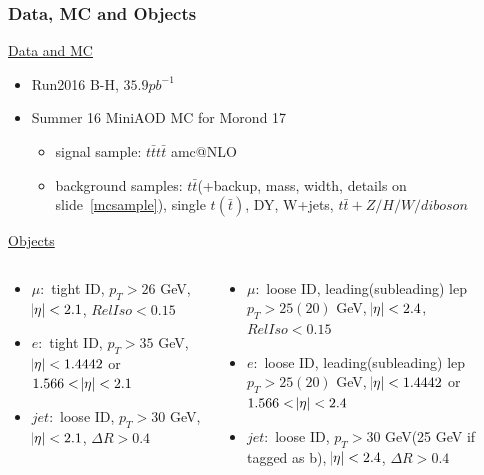 \documentclass{beamer}
\begin{document}

\begin{frame}
\frametitle{Data, MC and Objects}
	\underline{\small {Data and MC}}
	\begin{itemize}
		\item {\small Run2016 B-H, $35.9 pb^{-1}$}
		\item {\small Summer 16 MiniAOD MC for Morond 17}
		\begin{itemize}
			\item signal sample: $t\bar{t}t\bar{t}$ amc@NLO
			\item background samples: $t\bar{t}$(+backup, mass, width, details on slide~\ref{mcsample}), single $t(\bar{t})$, DY, W+jets, $t\bar{t}+Z/H/W/diboson$
		\end{itemize}
	\end{itemize}
	\underline{{\small Objects}}
	\vspace{-20pt}
	\begin{columns}
		\begin{column}{0.5\textwidth}  \vspace{-15pt}
			\begin{itemize}
				\item $\mu:$ {\scriptsize tight ID, $p_{T}>26$ GeV, $\abs{\eta}<2.1$, $RelIso<0.15$} 
				\item $e:$ {\scriptsize tight ID, $p_{T}>35$ GeV, $\abs{\eta}<1.4442$ or $1.566<\abs{\eta}<2.1$} 
				\item $jet:$ {\scriptsize loose ID, $p_{T}>30$ GeV, $\abs{\eta}<2.1$, $\Delta R>0.4$} 
			\end{itemize}
		\end{column}
		\begin{column}{0.5\textwidth}
			\begin{itemize}
				\item $\mu:$ {\scriptsize loose ID, leading(subleading) lep $p_{T}>25(20)$ GeV, $\abs{\eta}<2.4$, $RelIso<0.15$}  \vspace{-5pt}
				\item $e:$ {\scriptsize loose ID, leading(subleading) lep $p_{T}>25(20)$ GeV, $\abs{\eta}<1.4442$ or $1.566<\abs{\eta}<2.4$} \vspace{-5pt}
				\item $jet:$ {\scriptsize loose ID, $p_{T}>30$ GeV(25 GeV if tagged as b), $\abs{\eta}<2.4$, $\Delta R>0.4$} 
			\end{itemize}
		\end{column}
	\end{columns}
\end{frame}
\end{document}
